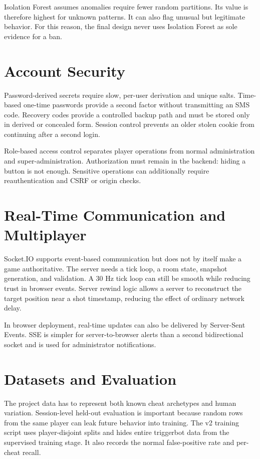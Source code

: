\documentclass[12pt,a4paper,oneside]{report}
\begin{document}
Isolation Forest assumes anomalies require fewer random partitions. Its value is therefore highest for unknown patterns. It can also flag unusual but legitimate behavior. For this reason, the final design never uses Isolation Forest as sole evidence for a ban.

\section{Account Security}
Password-derived secrets require slow, per-user derivation and unique salts. Time-based one-time passwords provide a second factor without transmitting an SMS code. Recovery codes provide a controlled backup path and must be stored only in derived or concealed form. Session control prevents an older stolen cookie from continuing after a second login.

Role-based access control separates player operations from normal administration and super-administration. Authorization must remain in the backend: hiding a button is not enough. Sensitive operations can additionally require reauthentication and CSRF or origin checks.

\section{Real-Time Communication and Multiplayer}
Socket.IO supports event-based communication but does not by itself make a game authoritative. The server needs a tick loop, a room state, snapshot generation, and validation. A 30 Hz tick loop can still be smooth while reducing trust in browser events. Server rewind logic allows a server to reconstruct the target position near a shot timestamp, reducing the effect of ordinary network delay.

In browser deployment, real-time updates can also be delivered by Server-Sent Events. SSE is simpler for server-to-browser alerts than a second bidirectional socket and is used for administrator notifications.

\section{Datasets and Evaluation}
The project data has to represent both known cheat archetypes and human variation. Session-level held-out evaluation is important because random rows from the same player can leak future behavior into training. The v2 training script uses player-disjoint splits and hides entire triggerbot data from the supervised training stage. It also records the normal false-positive rate and per-cheat recall.
\end{document}
